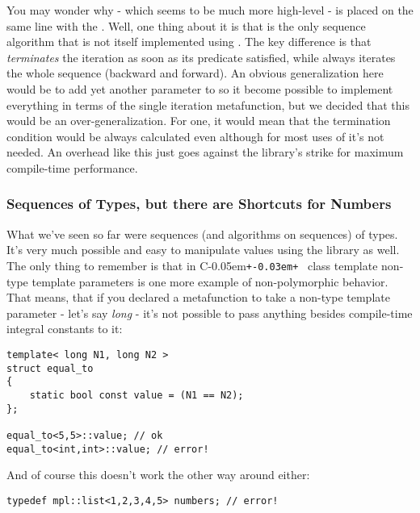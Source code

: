 \documentclass{kapproc}
\newcommand{\Cpp}{C\kern-0.05em\texttt{+\kern-0.03em+}%
}
\begin{document}
You may wonder why  - which seems to be much 
more high-level - is placed on the same line with the 
. Well, one thing about it is that 
 is the only sequence algorithm that is not 
itself implemented using . The key difference 
is that  \emph{terminates} the iteration as 
soon as its predicate satisfied, while  
always iterates the whole sequence (backward and forward). 
An obvious generalization here would be to add yet another 
parameter to  so it become possible to 
implement everything in terms of the single iteration 
metafunction, but we decided that this would be an 
over-generalization. For one, it would mean that the 
termination condition would be always calculated even 
although for most uses of  it's not needed. 
An overhead like this just goes against the library's strike 
for maximum compile-time performance.


\subsubsection{Sequences of Types, but there are Shortcuts for Numbers}

What we've seen so far were sequences (and algorithms on 
sequences) of types. It's very much possible and easy to 
manipulate values using the library as well. The only thing 
to remember is that in \Cpp\ class template non-type template 
parameters is one more example of non-polymorphic behavior. %
That means, that if you declared a metafunction to take a 
non-type template parameter - let's say \emph{long} - 
it's not possible to pass anything besides compile-time 
integral constants to it:

{\small
\begin{codesamp}\begin{verbatim}
template< long N1, long N2 >
struct equal_to
{
    static bool const value = (N1 == N2);
};

equal_to<5,5>::value; // ok
equal_to<int,int>::value; // error!
\end{verbatim}
\end{codesamp}
}

And of course this doesn't work the other way around either:

{\small
\begin{codesamp}\begin{verbatim}
typedef mpl::list<1,2,3,4,5> numbers; // error!
\end{verbatim}
\end{codesamp}
}
\end{document}
